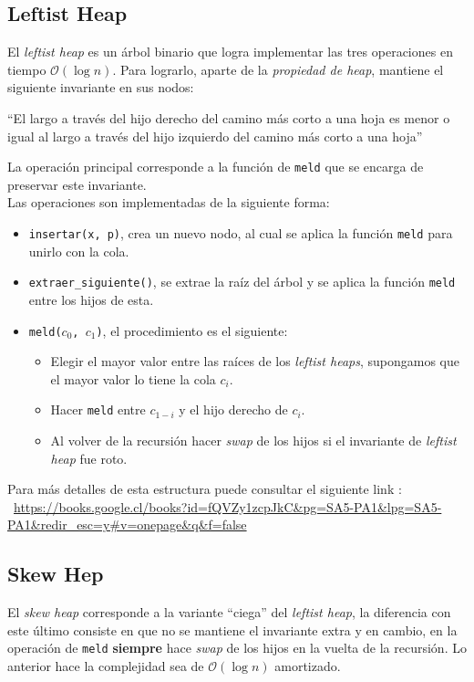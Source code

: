 \documentclass[dcc,uchile]{fcfmcourse}
\begin{document}
\subsection{Leftist Heap}
El \textit{leftist heap} es un árbol binario que logra implementar las tres operaciones en tiempo $\mathcal{O}(\log{n})$. Para lograrlo, aparte de la \textit{propiedad de heap}, mantiene el siguiente invariante en sus nodos:
\begin{displayquote}
``El largo a través del hijo derecho del camino más corto a una hoja es menor o igual al largo a través del hijo izquierdo del camino más corto a una hoja''
\end{displayquote}
La operación principal corresponde a la función de \texttt{meld} que se encarga de preservar este invariante.\\

Las operaciones son implementadas de la siguiente forma:
\begin{itemize}
    \item \texttt{insertar(x, p)}, crea un nuevo nodo, al cual se aplica la función \texttt{meld} para unirlo con la cola.
    \item \texttt{extraer\_siguiente()}, se extrae la raíz del árbol y se aplica la función \texttt{meld} entre los hijos de esta.
    \item \texttt{meld($c_{0}$, $c_{1}$)}, el procedimiento es el siguiente:
    \begin{itemize}
        \item Elegir el mayor valor entre las raíces de los \textit{leftist heaps}, supongamos que el mayor valor lo tiene la cola $c_i$.
        \item Hacer \texttt{meld} entre $c_{1-i}$ y el hijo derecho de $c_i$.
        \item Al volver de la recursión hacer \textit{swap} de los hijos si el invariante de \textit{leftist heap} fue roto.
    \end{itemize}
\end{itemize}
Para más detalles de esta estructura puede consultar el  siguiente link :  \ 
\url{https://books.google.cl/books?id=fQVZy1zcpJkC&pg=SA5-PA1&lpg=SA5-PA1&redir_esc=y#v=onepage&q&f=false}

\subsection{Skew Hep}
El \textit{skew heap} corresponde a la variante ``ciega'' del \textit{leftist heap}, la diferencia con este último consiste en que no se mantiene el invariante extra y en cambio, en la operación de \texttt{meld} \textbf{siempre} hace \textit{swap} de los hijos en la vuelta de la recursión. Lo anterior hace la complejidad sea de $\mathcal{O}(\log{n})$ amortizado.\
\end{document}
